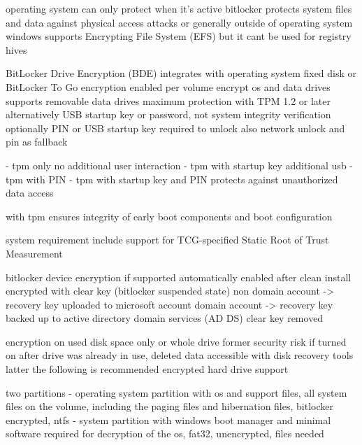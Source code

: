 operating system can only protect when it's active
bitlocker protects system files and data against physical access attacks or generally outside of operating system
windows supports Encrypting File System (EFS) but it cant be used for registry hives
\cite[9. BitLocker Drive encryption]{windows-internals-6-part2}

\cite{microsoft-bitlocker-overview}
\cite{microsoft-bitlocker-device-encryption}
BitLocker Drive Encryption (BDE) integrates with operating system
fixed disk or BitLocker To Go
encryption enabled per volume
encrypt os and data drives
supports removable data drives
maximum protection with TPM 1.2 or later
alternatively USB startup key or password, not system integrity verification
optionally PIN or USB startup key required to unlock
also network unlock and pin as fallback

- tpm only
no additional user interaction
- tpm with startup key
additional usb
- tpm with PIN
- tpm with startup key and PIN
protects against unauthorized data access
\cite{microsoft-bitlocker-countermeasures}

with tpm ensures integrity of early boot components and boot configuration


system requirement
include support for TCG-specified Static Root of Trust Measurement

bitlocker device encryption if supported automatically enabled
after clean install encrypted with clear key (bitlocker suspended state)
non domain account -> recovery key uploaded to microsoft account
domain account -> recovery key backed up to active directory domain services (AD DS)
clear key removed

encryption on used disk space only or whole drive
former security risk if turned on after drive was already in use, deleted data accessible with disk recovery tools
latter the following is recommended
encrypted hard drive support

two partitions
- operating system partition with os and support files, all system files on the volume, including the paging files and hibernation files, bitlocker encrypted, ntfs
- system partition with windows boot manager and minimal software required for decryption of the os, fat32, unencrypted, files needed

